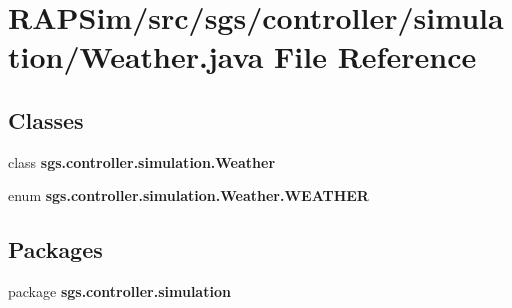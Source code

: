 \section{R\-A\-P\-Sim/src/sgs/controller/simulation/\-Weather.java File Reference}
\label{_weather_8java}
\subsection*{Classes}
\begin{DoxyCompactItemize}
\item 
class {\bf sgs.\-controller.\-simulation.\-Weather}
\item 
enum {\bf sgs.\-controller.\-simulation.\-Weather.\-W\-E\-A\-T\-H\-E\-R}
\end{DoxyCompactItemize}
\subsection*{Packages}
\begin{DoxyCompactItemize}
\item 
package {\bf sgs.\-controller.\-simulation}
\end{DoxyCompactItemize}
